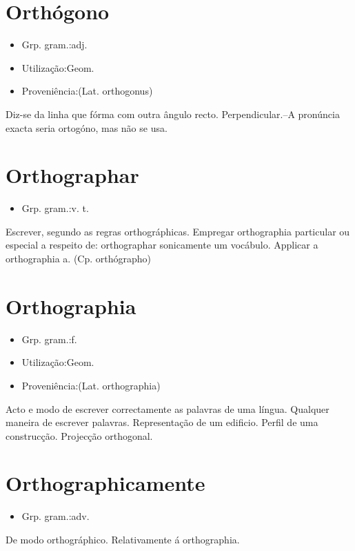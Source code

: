 \section{Orthógono}
\begin{itemize}
\item {Grp. gram.:adj.}
\end{itemize}
\begin{itemize}
\item {Utilização:Geom.}
\end{itemize}
\begin{itemize}
\item {Proveniência:(Lat. \textunderscore orthogonus\textunderscore )}
\end{itemize}
Diz-se da linha que fórma com outra ângulo recto.
Perpendicular.--A pronúncia exacta seria ortogóno, mas não se usa.
\section{Orthographar}
\begin{itemize}
\item {Grp. gram.:v. t.}
\end{itemize}
Escrever, segundo as regras orthográphicas.
Empregar orthographia particular ou especial a respeito de: \textunderscore orthographar sonicamente um vocábulo\textunderscore .
Applicar a orthographia a.
(Cp. \textunderscore orthógrapho\textunderscore )
\section{Orthographia}
\begin{itemize}
\item {Grp. gram.:f.}
\end{itemize}
\begin{itemize}
\item {Utilização:Geom.}
\end{itemize}
\begin{itemize}
\item {Proveniência:(Lat. \textunderscore orthographia\textunderscore )}
\end{itemize}
Acto e modo de escrever correctamente as palavras de uma língua.
Qualquer maneira de escrever palavras.
Representação de um edificio.
Perfil de uma construcção.
Projecção orthogonal.
\section{Orthographicamente}
\begin{itemize}
\item {Grp. gram.:adv.}
\end{itemize}
De modo orthográphico.
Relativamente á orthographia.
